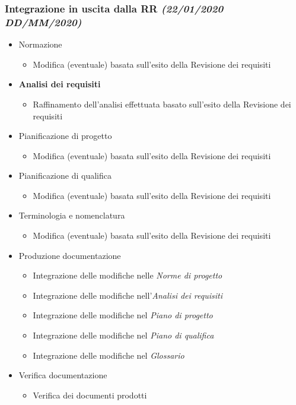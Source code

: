 \documentclass[../piano-di-progetto.tex]{subfiles}
\begin{document}
\subsubsection[Integrazione in uscita dalla RR]{Integrazione in uscita dalla RR {\normalsize\normalfont\itshape(22/01/2020  DD/MM/2020)}}%
\label{subs:integrazione_in_uscita_dalla_rr}
\begin{itemize}
  \item Normazione
  \begin{itemize}
    \item Modifica (eventuale) basata sull'esito della Revisione dei requisiti
  \end{itemize}
  \item \textbf{Analisi dei requisiti}
  \begin{itemize}
    \item Raffinamento dell'analisi effettuata basato sull'esito della Revisione dei requisiti
  \end{itemize}
  \item Pianificazione di progetto
  \begin{itemize}
    \item Modifica (eventuale) basata sull'esito della Revisione dei requisiti
  \end{itemize}
  \item Pianificazione di qualifica
  \begin{itemize}
    \item Modifica (eventuale) basata sull'esito della Revisione dei requisiti
  \end{itemize}
  \item Terminologia e nomenclatura
  \begin{itemize}
    \item Modifica (eventuale) basata sull'esito della Revisione dei requisiti
  \end{itemize}
  \item Produzione documentazione
  \begin{itemize}
    \item Integrazione delle modifiche nelle \textit{Norme di progetto}
    \item Integrazione delle modifiche nell'\textit{Analisi dei requisiti}
    \item Integrazione delle modifiche nel \textit{Piano di progetto}
    \item Integrazione delle modifiche nel \textit{Piano di qualifica}
    \item Integrazione delle modifiche nel \textit{Glossario}
  \end{itemize}
  \item Verifica documentazione
  \begin{itemize}
    \item Verifica dei documenti prodotti
  \end{itemize}
\end{itemize}
\end{document}
